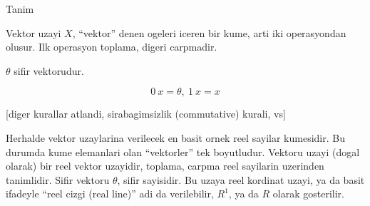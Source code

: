\documentclass[12pt,fleqn]{article}
\begin{document}
Tanim 

Vektor uzayi $X$, ``vektor'' denen ogeleri iceren bir kume, arti iki
operasyondan olusur. Ilk operasyon toplama, digeri carpmadir. 

$\theta$ sifir vektorudur. 

\[ 0 \ x = \theta, \ 1 \ x = x \]

[diger kurallar atlandi, sirabagimsizlik (commutative) kurali, vs]

Herhalde vektor uzaylarina verilecek en basit ornek reel sayilar
kumesidir. Bu durumda kume elemanlari olan ``vektorler'' tek
boyutludur. Vektoru uzayi (dogal olarak) bir reel vektor uzayidir, toplama,
carpma reel sayilarin uzerinden tanimlidir. Sifir vektoru $\theta$, sifir
sayisidir. Bu uzaya reel kordinat uzayi, ya da basit ifadeyle ``reel cizgi
(real line)'' adi da verilebilir, $R^1$, ya da $R$ olarak gosterilir. 
\end{document}
